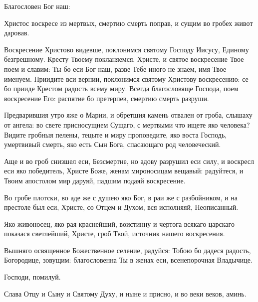 \begin{mymulticols}


 Благословен Бог наш:

 \MolitvamiSviatyhOtecNashih

Христос воскресе из мертвых, смертию смерть поправ, и сущим во гробех живот даровав.  

Воскресение Христово видевше, поклонимся святому Господу Иисусу, Единому безгрешному. Кресту Твоему покланяемся, Христе, и святое воскресение Твое поем и славим: Ты бо еси Бог наш, разве Тебе иного не знаем, имя Твое именуем. Приидите вси вернии, поклонимся святому Христову воскресению: се бо прииде Крестом радость всему миру. Всегда благословяще Господа, поем воскресение Его: распятие бо претерпев, смертию смерть разруши.  


Предварившия утро яже о Марии, и обретшия камень отвален от гроба, слышаху от ангела: во свете присносущнем Сущаго, с мертвыми что ищете яко человека? Видите гробныя пелены, тецыте и миру проповедите, яко воста Господь, умертвивый смерть, яко есть Сын Бога, спасающаго род человеческий. 


Аще и во гроб снизшел еси, Безсмертне, но адову разрушил еси силу, и воскресл еси яко победитель, Христе Боже, женам мироносицам вещавый: радуйтеся, и Твоим апостолом мир даруяй, падшим подаяй воскресение. 


Во гробе плотски, во аде же с душею яко Бог, в раи же с разбойником, и на престоле был еси, Христе, со Отцем и Духом, вся исполняяй, Неописанный. 

\slava

Яко живоносец, яко рая краснейший, воистинну и чертога всякаго царскаго показася светлейший, Христе, гроб Твой, источник нашего воскресения. 

\inyne

Вышняго освященное Божественное селение, радуйся: Тобою бо дадеся радость, Богородице, зовущим: благословенна Ты в женах еси, всенепорочная Владычице. 

Господи, помилуй. 

Слава Отцу и Сыну и Святому Духу, и ныне и присно, и во веки веков, аминь. 


\end{mymulticols}
